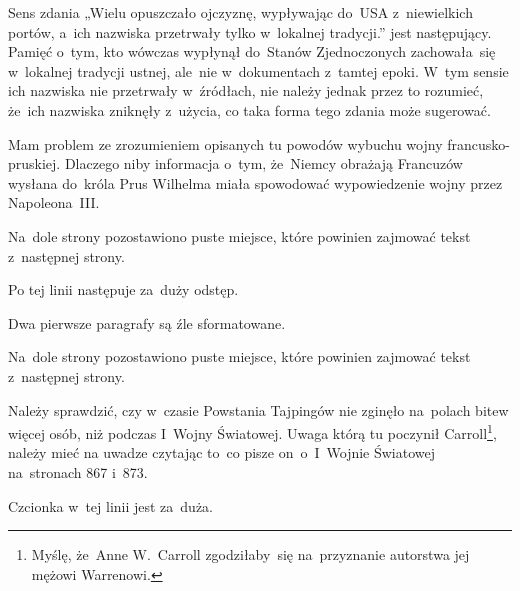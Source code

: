 \documentclass[a4paper,11pt]{article}
\begin{document}
\vspace{\spaceFour}


\start {} Sens zdania „Wielu opuszczało ojczyznę,
wypływając do~USA z~niewielkich portów, a~ich nazwiska przetrwały
tylko w~lokalnej tradycji.” jest następujący. Pamięć o~tym, kto
wówczas wypłynął do~Stanów Zjednoczonych zachowała~się w~lokalnej
tradycji ustnej, ale~nie w~dokumentach z~tamtej epoki. W~tym sensie
ich nazwiska nie przetrwały w~źródłach, nie należy jednak przez to
rozumieć, że~ich nazwiska zniknęły z~użycia, co taka forma tego zdania
może sugerować.

\vspace{\spaceFour}


\start {} Mam problem ze zrozumieniem opisanych tu powodów
wybuchu wojny francusko-pruskiej. Dlaczego niby informacja o~tym,
że~Niemcy obrażają Francuzów wysłana do~króla Prus Wilhelma miała
spowodować wypowiedzenie wojny przez Napoleona~III.

\vspace{\spaceFour}


\start {} Na~dole strony pozostawiono puste miejsce, które
powinien zajmować tekst z~następnej strony.

\vspace{\spaceFour}


\start {} Po tej linii następuje za~duży odstęp.

\vspace{\spaceFour}


\start {} Dwa pierwsze paragrafy są źle sformatowane.

\vspace{\spaceFour}


\start {} Na~dole strony pozostawiono puste miejsce, które
powinien zajmować tekst z~następnej strony.

\vspace{\spaceFour}


\start {} Należy sprawdzić, czy w~czasie Powstania Tajpingów
nie zginęło na~polach bitew więcej osób, niż podczas I~Wojny
Światowej. Uwaga którą tu poczynił Carroll\footnote{Myślę, że~Anne
  W.~Carroll zgodziłaby~się na~przyznanie autorstwa jej mężowi
  Warrenowi.}, należy mieć na uwadze czytając to~co pisze
on~o~I~Wojnie Światowej na~stronach 867 i~873.

\vspace{\spaceFour}


\start {} Czcionka w~tej linii jest za~duża.
\end{document}
